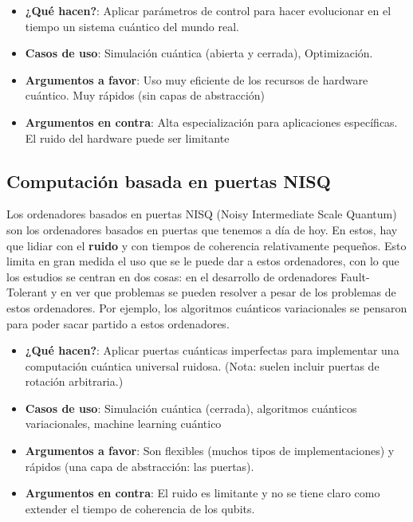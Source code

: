 \begin{itemize}
\item \textbf{¿Qué hacen?}: Aplicar parámetros de control para hacer evolucionar en el tiempo un sistema cuántico del mundo real.

\item \textbf{Casos de uso}: Simulación cuántica (abierta y cerrada), Optimización.

\item \textbf{Argumentos a favor}: Uso muy eficiente de los recursos de hardware cuántico. Muy rápidos (sin capas de abstracción)

\item \textbf{Argumentos en contra}: Alta especialización para aplicaciones específicas. El ruido del hardware puede ser limitante
\end{itemize}


\subsection{Computación basada en puertas NISQ}

Los ordenadores basados en puertas NISQ (Noisy Intermediate Scale Quantum) son los ordenadores basados en puertas que tenemos a día de hoy. En estos, hay que lidiar con el \textbf{ruido} y con tiempos de coherencia relativamente pequeños. Esto limita en gran medida el uso que se le puede dar a estos ordenadores, con lo que los estudios se centran en dos cosas: en el desarrollo de ordenadores Fault-Tolerant y en ver que problemas se pueden resolver a pesar de los problemas de estos ordenadores. Por ejemplo, los algoritmos cuánticos variacionales se pensaron para poder sacar partido a estos ordenadores.


\begin{itemize}
\item \textbf{¿Qué hacen?}: Aplicar puertas cuánticas imperfectas para implementar una computación cuántica universal ruidosa. (Nota: suelen incluir puertas de rotación arbitraria.)

\item \textbf{Casos de uso}: Simulación cuántica (cerrada), algoritmos cuánticos variacionales, machine learning cuántico

\item \textbf{Argumentos a favor}: Son flexibles (muchos tipos de implementaciones) y rápidos (una capa de abstracción: las puertas).

\item \textbf{Argumentos en contra}: El ruido es limitante y no se tiene claro como extender el tiempo de coherencia de los qubits.

\end{itemize}




